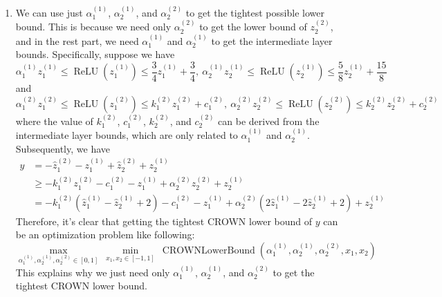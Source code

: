 \documentclass[12pt]{article}
\newcommand{\maxwithcond}[2]{\underset{#2}{\max}\ #1}
\newcommand{\minwithcond}[2]{\underset{#2}{\min}\ #1}
\newcommand{\var}[3]{#1_{#2}^{(#3)}}
\newcommand{\relu}[1]{\operatorname{ReLU}\left(#1\right)}
\begin{document}
\begin{enumerate}[1.]
\item We can use just $\var{\alpha}{1}{1}$, $\var{\alpha}{2}{1}$, and $\var{\alpha}{2}{2}$ to get the tightest possible lower bound. This is because we need only $\var{\alpha}{2}{2}$ to get the lower bound of $\var{z}{2}{2}$, and in the rest part, we need $\var{\alpha}{1}{1}$ and $\var{\alpha}{2}{1}$ to get the intermediate layer bounds. Specifically, suppose we have
	\begin{equation}
		\var{\alpha}{1}{1} \var{z}{1}{1} \leqslant \relu{\var{z}{1}{1}} \leqslant \frac{3}{4} \var{z}{1}{1} + \frac{3}{4}, \ \var{\alpha}{2}{1} \var{z}{2}{1} \leqslant \relu{\var{z}{2}{1}} \leqslant \frac{5}{8} \var{z}{2}{1} + \frac{15}{8}
	\end{equation}
	and
	\begin{equation}
		\var{\alpha}{1}{2} \var{z}{1}{2} \leqslant \relu{\var{z}{1}{2}} \leqslant \var{k}{1}{2} \var{z}{1}{2} + \var{c}{1}{2}, \ \var{\alpha}{2}{2} \var{z}{2}{2} \leqslant \relu{\var{z}{2}{2}} \leqslant \var{k}{2}{2} \var{z}{2}{2} + \var{c}{2}{2}
	\end{equation}
	where the value of $\var{k}{1}{2}$, $\var{c}{1}{2}$, $\var{k}{2}{2}$, and $\var{c}{2}{2}$ can be derived from the intermediate layer bounds, which are only related to $\var{\alpha}{1}{1}$ and $\var{\alpha}{2}{1}$. Subsequently, we have
	\begin{equation}
		\begin{aligned}
			y & = -\var{\hat{z}}{1}{2} - \var{z}{1}{1} + \var{\hat{z}}{2}{2} + \var{z}{2}{1}\\
			& \geqslant -\var{k}{1}{2} \var{z}{1}{2} - \var{c}{1}{2} - \var{z}{1}{1} + \var{\alpha}{2}{2} \var{z}{2}{2} + \var{z}{2}{1}\\
			& =  -\var{k}{1}{2} (\var{\hat{z}}{1}{1} - \var{\hat{z}}{2}{1} + 2) - \var{c}{1}{2} - \var{z}{1}{1} + \var{\alpha}{2}{2} (2 \var{\hat{z}}{1}{1} - 2 \var{\hat{z}}{2}{1} + 2) + \var{z}{2}{1}
		\end{aligned}
	\end{equation}
	Therefore, it's clear that getting the tightest CROWN lower bound of $y$ can be an optimization problem like following:
	\begin{equation}
		\maxwithcond{\minwithcond{\operatorname{CROWNLowerBound}(\var{\alpha}{1}{1}, \var{\alpha}{2}{1}, \var{\alpha}{2}{2}, x_{1}, x_{2})}{x_{1}, x_{2} \in [-1, 1]}}{\var{\alpha}{1}{1}, \var{\alpha}{2}{1}, \var{\alpha}{2}{2} \in [0, 1]}
	\end{equation} 
	This explains why we just need only $\var{\alpha}{1}{1}$, $\var{\alpha}{2}{1}$, and $\var{\alpha}{2}{2}$ to get the tightest CROWN lower bound.

\end{enumerate}
\end{document}

